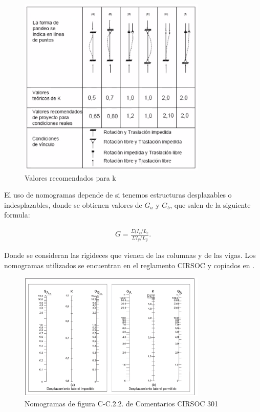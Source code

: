 \documentclass[../main.tex]{subfiles}
\begin{document}
\begin{figure}[ht]
  \centering
  \includegraphics[width=0.8\textwidth]{../images/20210419/long-efectiva}
  \caption{Valores recomendados para k}
  \label{fig:long-efectiva}
\end{figure}

El uso de nomogramas depende de si tenemos estructuras desplazables o indesplazables,
donde se obtienen valores de $G_a$ y  $G_b$, que salen de la siguiente formula:

\begin{align*}
  G = \frac{\Sigma (I_c / L_c}{\Sigma I_g / L_g}
.\end{align*}

Donde se consideran las rigideces que vienen de las columnas y de las vigas. Los 
nomogramas utilizados se encuentran en el reglamento CIRSOC y copiados en 
.

\begin{figure}[htpb]
  \centering
  \includegraphics[width=0.8\textwidth]{../images/20210419/nomogramas}
  \caption{Nomogramas de figura C-C.2.2. de Comentarios CIRSOC 301}
  \label{fig:nomogramas}
\end{figure}
\end{document}
